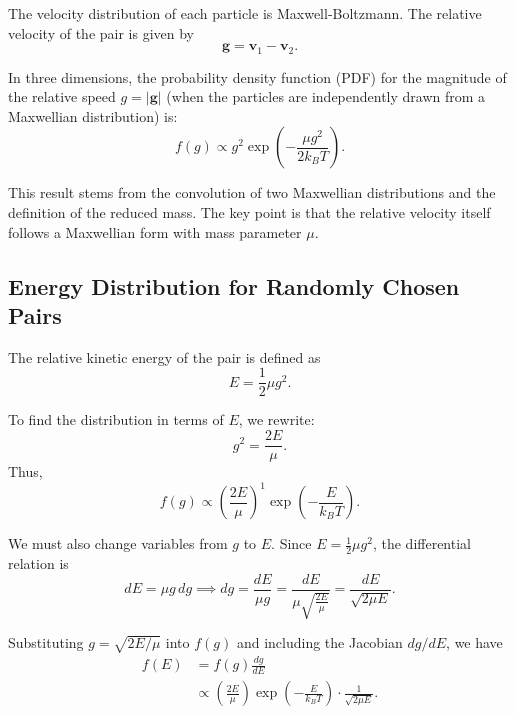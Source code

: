 The velocity distribution of each particle is Maxwell-Boltzmann. The relative velocity of the pair is given by
\begin{equation}
  \mathbf{g} = \mathbf{v}_1 - \mathbf{v}_2.
\end{equation}

In three dimensions, the probability density function (PDF) for the magnitude of the relative speed $g = |\mathbf{g}|$ (when the particles are independently drawn from a Maxwellian distribution) is:
\begin{equation}
  f(g) \propto g^{2} \exp\left(-\frac{\mu g^{2}}{2 k_B T}\right).
\end{equation}

This result stems from the convolution of two Maxwellian distributions and the definition of the reduced mass. The key point is that the relative velocity itself follows a Maxwellian form with mass parameter $\mu$.

\subsection{Energy Distribution for Randomly Chosen Pairs}

The relative kinetic energy of the pair is defined as
\begin{equation}
  E = \frac{1}{2}\mu g^{2}.
\end{equation}

To find the distribution in terms of $E$, we rewrite:
\begin{equation}
  g^{2} = \frac{2E}{\mu}.
\end{equation}
Thus,
\begin{equation}
  f(g) \propto \left(\frac{2E}{\mu}\right)^{\!1} \exp\left(-\frac{E}{k_B T}\right).
\end{equation}

We must also change variables from $g$ to $E$. Since $E = \frac{1}{2}\mu g^{2}$, the differential relation is
\begin{equation}
  dE = \mu g \, dg \implies dg = \frac{dE}{\mu g} = \frac{dE}{\mu \sqrt{\frac{2E}{\mu}}} = \frac{dE}{\sqrt{2\mu E}}.
\end{equation}

Substituting $g = \sqrt{2E/\mu}$ into $f(g)$ and including the Jacobian $dg/dE$, we have
\begin{align}
  f(E) &= f(g) \frac{dg}{dE} \nonumber \\
       &\propto \left(\frac{2E}{\mu}\right) \exp\left(-\frac{E}{k_B T}\right) \cdot \frac{1}{\sqrt{2\mu E}}.
\end{align}


